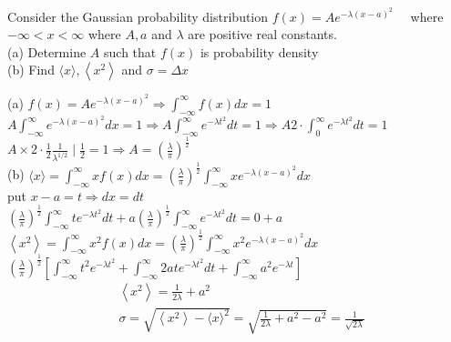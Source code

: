 \begin{enumerate}
	\begin{minipage}{\textwidth}
	\item Consider the Gaussian probability distribution $f(x)=A e^{-\lambda(x-a)^{2}} \quad$ where $-\infty<x<\infty$ where $A, a$ and $\lambda$ are positive real constants.\\
	(a) Determine $A$ such that $f(x)$ is probability density\\
	(b) Find $\langle x\rangle,\left\langle x^{2}\right\rangle$ and $\sigma=\Delta x$\\
\end{minipage}
\begin{answer}
(a)	$f(x)=A e^{-\lambda(x-a)^{2}} \Rightarrow \int_{-\infty}^{\infty} f(x) d x=1$\\
	$A \int_{-\infty}^{\infty} e^{-\lambda(x-a)^{2}} d x=1 \Rightarrow A \int_{-\infty}^{\infty} e^{-\lambda t^{2}} d t=1 \Rightarrow A 2 \cdot \int_{0}^{\infty} e^{-\lambda t^{2}} d t=1$\\
	$A \times 2 \cdot \frac{1}{2} \frac{1}{\lambda^{1 / 2}} \mid \frac{1}{2}=1 \Rightarrow A=\left(\frac{\lambda}{\pi}\right)^{\frac{1}{2}}$\\
	(b) $\langle x\rangle=\int_{-\infty}^{\infty} x f(x) d x=\left(\frac{\lambda}{\pi}\right)^{\frac{1}{2}} \int_{-\infty}^{\infty} x e^{-\lambda(x-a)^{2}} d x$\\
	put $x-a=t \Rightarrow d x=d t$\\
	$\left(\frac{\lambda}{\pi}\right)^{\frac{1}{2}} \int_{-\infty}^{\infty} t e^{-\lambda t^{2}} d t+a\left(\frac{\lambda}{\pi}\right)^{\frac{1}{2}} \int_{-\infty}^{\infty} e^{-\lambda t^{2}} d t=0+a$\\
	$\left\langle x^{2}\right\rangle=\int_{-\infty}^{\infty} x^{2} f(x) d x=\left(\frac{\lambda}{\pi}\right)^{\frac{1}{2}} \int_{-\infty}^{\infty} x^{2} e^{-\lambda(x-a)^{2}} d x$\\
	$\left(\frac{\lambda}{\pi}\right)^{\frac{1}{2}}\left[\int_{-\infty}^{\infty} t^{2} e^{-\lambda t^{2}}+\int_{-\infty}^{\infty} 2 a t e^{-\lambda t^{2}} d t+\int_{-\infty}^{\infty} a^{2} e^{-\lambda t}\right]$\\
	\begin{align*}
		&\left\langle x^{2}\right\rangle=\frac{1}{2 \lambda}+a^{2} \\
		&\sigma=\sqrt{\left\langle x^{2}\right\rangle-\langle x\rangle^{2}}=\sqrt{\frac{1}{2 \lambda}+a^{2}-a^{2}}=\frac{1}{\sqrt{2 \lambda}}
	\end{align*}
\end{answer}

\end{enumerate}
